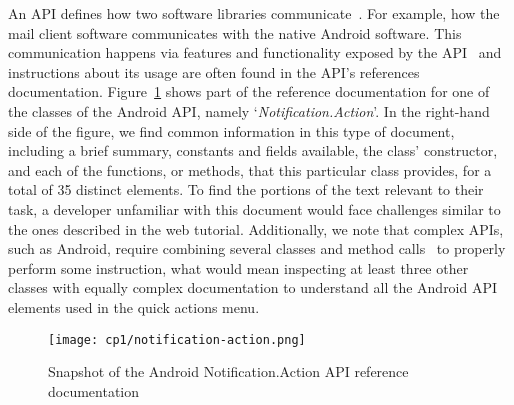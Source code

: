 An \acf{API} defines how  two software libraries communicate~\cite{robillard2011field}.
For example, how the mail client software communicates 
with the native Android software. This communication happens via features and functionality exposed by the API~\cite{Robillard2015} 
and instructions about its usage are often found in the API's references documentation.
Figure~\ref{fig:android-notification-action} shows part of the reference documentation for one of the classes of the Android API, namely `\textit{Notification.Action}'. 
In the right-hand side of the figure, we find common 
information in this type of document, including a brief summary,
constants and fields available, the class' constructor, and 
each of the functions, or methods, that this particular class provides,  
for a total of 35 distinct elements.
To find the portions of the text relevant to
their task,
a developer unfamiliar with this document would 
face challenges similar to the ones  described in the web tutorial. Additionally, 
we note that complex APIs, 
such as Android, require combining several classes
and method calls~\cite{robillard2011field} to properly perform some instruction,
what would mean inspecting at least three other classes 
with equally complex documentation
to understand all the Android API elements used in the quick actions menu.





\begin{figure}
    \centering
    \texttt{[image: cp1/notification-action.png]}
    \caption{Snapshot of the Android Notification.Action API reference documentation}
    \label{fig:android-notification-action}
\end{figure}




